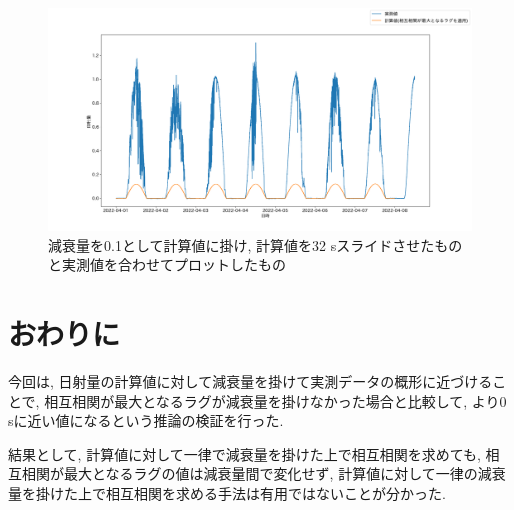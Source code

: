 \documentclass[a4j,12pt,]{jarticle}
\begin{document}
\begin{figure}[H]
  \begin{center}
    \includegraphics[width=160mm]{0.1.png}
    \caption{減衰量を0.1として計算値に掛け, 計算値を32 \si{\second}スライドさせたものと実測値を合わせてプロットしたもの}
    \label{p6}
  \end{center}
\end{figure}

\section{おわりに}
今回は, 日射量の計算値に対して減衰量を掛けて実測データの概形に近づけることで, 相互相関が最大となるラグが減衰量を掛けなかった場合と比較して, より0 \si{\second}に近い値になるという推論の検証を行った.

結果として, 計算値に対して一律で減衰量を掛けた上で相互相関を求めても, 相互相関が最大となるラグの値は減衰量間で変化せず, 計算値に対して一律の減衰量を掛けた上で相互相関を求める手法は有用ではないことが分かった.
\end{document}
